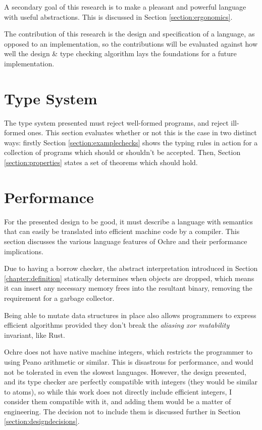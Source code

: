 \documentclass[12pt,twoside]{report}
\begin{document}
A secondary goal of this research is to make a pleasant and powerful language with useful abstractions. This is discussed in Section \ref{section:ergonomics}.

The contribution of this research is the design and specification of a language, as opposed to an implementation, so the contributions will be evaluated against how well the design \& type checking algorithm lays the foundations for a future implementation.

\section{Type System}
\label{section:typesystem}
The type system presented must reject well-formed programs, and reject ill-formed ones. This section evaluates whether or not this is the case in two distinct ways: firstly Section \ref{section:examplechecks} shows the typing rules in action for a collection of programs which should or shouldn't be accepted. Then, Section \ref{section:properties} states a set of theorems which should hold.

\section{Performance}
\label{section:performance}
For the presented design to be good, it must describe a language with semantics that can easily be translated into efficient machine code by a compiler. This section discusses the various language features of Ochre and their performance implications.

Due to having a borrow checker, the abstract interpretation introduced in Section \ref{chapter:definition} statically determines when objects are dropped, which means it can insert any necessary memory frees into the resultant binary, removing the requirement for a garbage collector.

Being able to mutate data structures in place also allows programmers to express efficient algorithms provided they don't break the \textit{aliasing xor mutability} invariant, like Rust.

Ochre does not have native machine integers, which restricts the programmer to using Peano arithmetic or similar. This is disastrous for performance, and would not be tolerated in even the slowest languages. However, the design presented, and its type checker are perfectly compatible with integers (they would be similar to atoms), so while this work does not directly include efficient integers, I consider them compatible with it, and adding them would be a matter of engineering. The decision not to include them is discussed further in Section \ref{section:designdecisions}.
\end{document}
